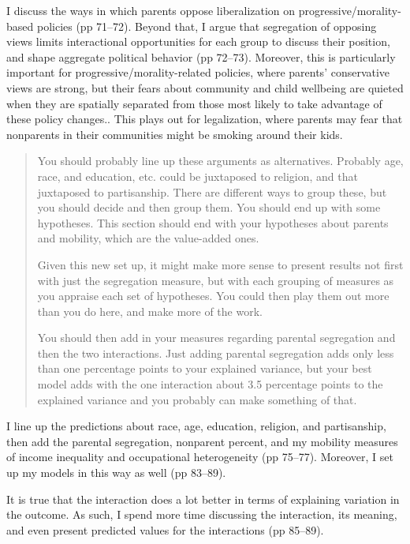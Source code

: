\documentclass[12pt,stdletter,dateno,sigleft]{newlfm} %
\begin{document}
\begin{newlfm}
I discuss the ways in which parents oppose liberalization on progressive/morality-based policies (pp 71--72). Beyond that, I argue that segregation of opposing views limits interactional opportunities for each group to discuss their position, and shape aggregate political behavior (pp 72--73). Moreover, this is particularly important for  progressive/morality-related policies, where parents' conservative views are strong, but their fears about community and child wellbeing are quieted when they are spatially separated from those most likely to take advantage of these policy changes.. This plays out for legalization, where parents may fear that nonparents in their communities might be smoking around their kids. 


\begin{quotation}{\color{red}\noindent \footnotesize
You should probably line up these arguments as alternatives.  Probably age, race, and education, etc. could be juxtaposed to religion, and that juxtaposed to partisanship.  There are different ways to group these, but you should decide and then group them.  You should end up with some hypotheses. This section should end with your hypotheses about parents and mobility, which are the value-added ones. \newline

\noindent Given this new set up, it might make more sense to present results not first with just the segregation measure, but with each grouping of measures as you appraise each set of hypotheses.  You could then play them out more than you do here, and make more of the work. \newline

\noindent You should then add in your measures regarding parental segregation and then the two interactions.   Just adding parental segregation adds only less than one percentage points to your explained variance, but your best model adds with the one interaction about 3.5 percentage points to the explained variance and you probably can make something of that.
}
\end{quotation}

 
I line up the predictions about race, age, education, religion, and partisanship, then add the parental segregation, nonparent percent, and my mobility measures of income inequality and occupational heterogeneity (pp 75--77). Moreover, I set up my models in this way as well (pp 83--89). 

It is true that the interaction does a lot better in terms of explaining variation in the outcome. As such, I spend more time discussing the interaction, its meaning, and even present predicted values for the interactions (pp 85--89).



\end{newlfm}
\end{document}
